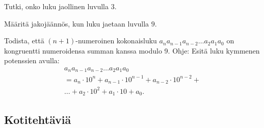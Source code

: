 \begin{tehtavasivu}


Tutki, onko luku jaollinen luvulla $3$.



Määritä jakojäännös, kun luku jaetaan luvulla $9$.

Todista, että $(n+1)$-numeroinen kokonaisluku $a_na_{n-1}a_{n-2}\ldots a_2a_1a_0$ on kongruentti numeroidensa summan kanssa modulo 9. Ohje: Esitä luku kymmenen potenssien avulla:
\begin{multline*}
a_na_{n-1}a_{n-2}\ldots a_2a_1a_0\\ = a_n \cdot 10^n + a_{n-1}\cdot 10^{n-1} + a_{n-2} \cdot 10^{n-2} + \\
\ldots + a_2 \cdot 10^2 + a_1 \cdot 10 + a_0.
\end{multline*}



\subsection*{Kotitehtäviä}


\end{tehtavasivu}
